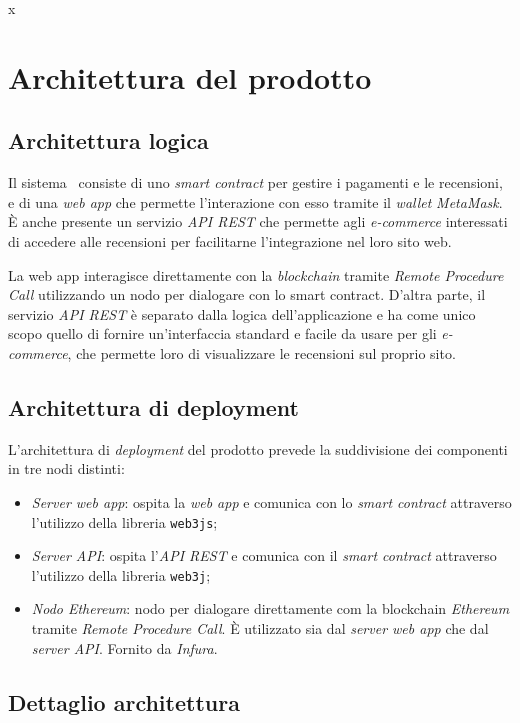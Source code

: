 x\section{Architettura del prodotto}

\subsection{Architettura logica}
Il sistema \capName\ consiste di uno \textit{smart contract} per gestire i pagamenti e le recensioni, e di una \textit{web app} che permette l'interazione con esso tramite il \textit{wallet} \textit{MetaMask}. È anche presente un servizio \textit{API REST} che permette agli \textit{e-commerce} interessati di accedere alle recensioni per facilitarne l'integrazione nel loro sito web.

La web app interagisce direttamente con la \textit{blockchain} tramite \textit{Remote Procedure Call} utilizzando un nodo per dialogare con lo smart contract. D'altra parte, il servizio \textit{API REST} è separato dalla logica dell'applicazione e ha come unico scopo quello di fornire un'interfaccia standard e facile da usare per gli \textit{e-commerce}, che permette loro di visualizzare le recensioni sul proprio sito.

\subsection{Architettura di deployment}
L'architettura di \textit{deployment} del prodotto prevede la suddivisione dei componenti in tre nodi distinti:
\begin{itemize}
    \item \textit{Server web app}: ospita la \textit{web app} e comunica con lo \textit{smart contract} attraverso l'utilizzo della libreria \texttt{web3js};
    \item \textit{Server API}: ospita l'\textit{API REST} e comunica con il \textit{smart contract} attraverso l'utilizzo della libreria \texttt{web3j};
    \item \textit{Nodo Ethereum}: nodo per dialogare direttamente com la blockchain \textit{Ethereum} tramite \textit{Remote Procedure Call}. È utilizzato sia dal \textit{server web app} che dal \textit{server API}. Fornito da \textit{Infura}.
\end{itemize}
\pagebreak

\subsection{Dettaglio architettura}
